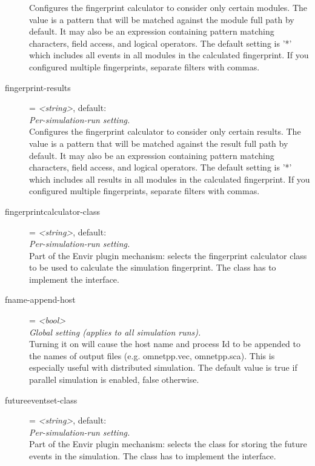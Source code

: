 \begin{description}
    Configures the fingerprint calculator to consider only certain modules. The
    value is a pattern that will be matched against the module full path by
    default. It may also be an expression containing pattern matching
    characters, field access, and logical operators. The default setting is '*'
    which includes all events in all modules in the calculated fingerprint. If
    you configured multiple fingerprints, separate filters with commas.
\item[fingerprint-results] = \textit{<string>}, default: \ttt{*}\\
    \textit{Per-simulation-run setting.}\\
    Configures the fingerprint calculator to consider only certain results. The
    value is a pattern that will be matched against the result full path by
    default. It may also be an expression containing pattern matching
    characters, field access, and logical operators. The default setting is '*'
    which includes all results in all modules in the calculated fingerprint. If
    you configured multiple fingerprints, separate filters with commas.
\item[fingerprintcalculator-class] = \textit{<string>}, default: \\
    \textit{Per-simulation-run setting.}\\
    Part of the Envir plugin mechanism: selects the fingerprint calculator
    class to be used to calculate the simulation fingerprint. The class has to
    implement the  interface.
\item[fname-append-host] = \textit{<bool>}\\
    \textit{Global setting (applies to all simulation runs).}\\
    Turning it on will cause the host name and process Id to be appended to the
    names of output files (e.g. omnetpp.vec, omnetpp.sca). This is especially
    useful with distributed simulation. The default value is true if parallel
    simulation is enabled, false otherwise.
\item[futureeventset-class] = \textit{<string>}, default: \\
    \textit{Per-simulation-run setting.}\\
    Part of the Envir plugin mechanism: selects the class for storing the
    future events in the simulation. The class has to implement the
     interface.

\end{description}
